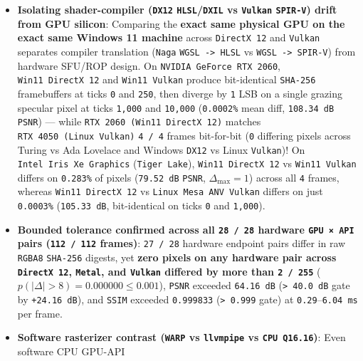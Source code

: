 \documentclass[10pt,letterpaper]{article}
\providecommand{\tightlist}{\setlength{\itemsep}{1pt}\setlength{\parskip}{0pt}}
\begin{document}
\begin{itemize}
\tightlist
\item
  \textbf{Isolating shader-compiler (\texttt{DX12}
  \texttt{HLSL}/\allowbreak{}\texttt{DXIL} vs \texttt{Vulkan} \texttt{SPIR-V}) drift
  from GPU silicon}: Comparing the \textbf{exact same physical GPU on
  the exact same Windows 11 machine} across \texttt{DirectX\ 12} and
  \texttt{Vulkan} separates compiler translation (\texttt{Naga}
  \texttt{WGSL\ -\textgreater{}\ HLSL} vs
  \texttt{WGSL\ -\textgreater{}\ SPIR-V}) from hardware SFU/ROP design.
  On \texttt{NVIDIA\ GeForce\ RTX\ 2060}, \texttt{Win11\ DirectX\ 12}
  and \texttt{Win11\ Vulkan} produce bit-identical \texttt{SHA-256}
  framebuffers at ticks \texttt{0} and \texttt{250}, then diverge by
  \texttt{1} LSB on a single grazing specular pixel at ticks
  \texttt{1,000} and \texttt{10,000} (\texttt{0.0002\%} mean diff,
  \texttt{108.\allowbreak{}34\ dB} \texttt{PSNR}) --- while
  \texttt{RTX\ 2060\ (\allowbreak{}Win11\ DirectX\ 12)} matches
  \texttt{RTX\ 4050\ (\allowbreak{}Linux\ Vulkan)} \texttt{4\ /\ 4} frames
  bit-for-bit (\texttt{0} differing pixels across Turing vs Ada Lovelace
  and Windows \texttt{DX12} vs Linux \texttt{Vulkan})! On
  \texttt{Intel\ Iris\ Xe\ Graphics} (\texttt{Tiger\ Lake}),
  \texttt{Win11\ DirectX\ 12} vs \texttt{Win11\ Vulkan} differs on
  \texttt{0.283\%} of pixels (\texttt{79.52\ dB} \texttt{PSNR},
  \(\Delta_{\max} = 1\)) across all \texttt{4} frames, whereas
  \texttt{Win11\ DirectX\ 12} vs \texttt{Linux\ Mesa\ ANV\ Vulkan}
  differs on just \texttt{0.0003\%} (\texttt{105.\allowbreak{}33\ dB}, bit-identical
  on ticks \texttt{0} and \texttt{1,000}).
\item
  \textbf{Bounded tolerance confirmed across all \texttt{28\ /\ 28}
  hardware \texttt{GPU\ ×\ API} pairs (\texttt{112\ /\allowbreak{}\ 112} frames)}:
  \texttt{27\ /\ 28} hardware endpoint pairs differ in raw
  \texttt{RGBA8} \texttt{SHA-256} digests, yet \textbf{zero pixels on
  any hardware pair across \texttt{DirectX\ 12}, \texttt{Metal}, and
  \texttt{Vulkan} differed by more than \texttt{2\ /\ 255}}
  (\(p(|\Delta| > 8) = 0.000000 \le 0.001\)), \texttt{PSNR} exceeded
  \texttt{64.16\ dB} (\texttt{\textgreater{}\ 40.0\ dB} gate by
  \texttt{+24.\allowbreak{}16\ dB}), and \texttt{SSIM} exceeded \texttt{0.999833}
  (\texttt{\textgreater{}\ 0.999} gate) at
  \texttt{0.29}--\texttt{6.04\ ms} per frame.
\item
  \textbf{Software rasterizer contrast (\texttt{WARP} vs
  \texttt{llvmpipe} vs \texttt{CPU\ Q16.\allowbreak{}16})}: Even software CPU GPU-API

\end{itemize}
\end{document}

